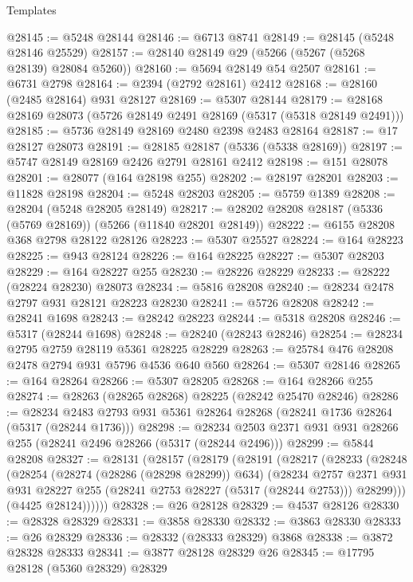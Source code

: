 \begin{lexlean}{Templates}
\begin{coremodule}
@28145 := @5248 @28144
@28146 := @6713 @8741
@28149 := @28145 (@5248 @28146 @25529)
@28157 := @28140 @28149 @29 (@5266 (@5267 (@5268 @28139) @28084 @5260))
@28160 := @5694 @28149 @54 @2507
@28161 := @6731 @2798
@28164 := @2394 (@2792 @28161) @2412
@28168 := @28160 (@2485 @28164) @931 @28127
@28169 := @5307 @28144
@28179 := @28168 @28169 @28073 (@5726 @28149 @2491 @28169 (@5317 (@5318 @28149 @2491)))
@28185 := @5736 @28149 @28169 @2480 @2398 @2483 @28164
@28187 := @17 @28127 @28073
@28191 := @28185 @28187 (@5336 (@5338 @28169))
@28197 := @5747 @28149 @28169 @2426 @2791 @28161 @2412
@28198 := @151 @28078
@28201 := @28077 (@164 @28198 @255)
@28202 := @28197 @28201
@28203 := @11828 @28198
@28204 := @5248 @28203
@28205 := @5759 @1389
@28208 := @28204 (@5248 @28205 @28149)
@28217 := @28202 @28208 @28187 (@5336 (@5769 @28169)) (@5266 (@11840 @28201 @28149))
@28222 := @6155 @28208 @368 @2798 @28122 @28126
@28223 := @5307 @25527
@28224 := @164 @28223
@28225 := @943 @28124
@28226 := @164 @28225
@28227 := @5307 @28203
@28229 := @164 @28227 @255
@28230 := @28226 @28229
@28233 := @28222 (@28224 @28230) @28073
@28234 := @5816 @28208
@28240 := @28234 @2478 @2797 @931 @28121 @28223 @28230
@28241 := @5726 @28208
@28242 := @28241 @1698
@28243 := @28242 @28223
@28244 := @5318 @28208
@28246 := @5317 (@28244 @1698)
@28248 := @28240 (@28243 @28246)
@28254 := @28234 @2795 @2759 @28119 @5361 @28225 @28229
@28263 := @25784 @476 @28208 @2478 @2794 @931 @5796 @4536 @640 @560
@28264 := @5307 @28146
@28265 := @164 @28264
@28266 := @5307 @28205
@28268 := @164 @28266 @255
@28274 := @28263 (@28265 @28268) @28225 (@28242 @25470 @28246)
@28286 := @28234 @2483 @2793 @931 @5361 @28264 @28268 (@28241 @1736 @28264 (@5317 (@28244 @1736)))
@28298 := @28234 @2503 @2371 @931 @931 @28266 @255 (@28241 @2496 @28266 (@5317 (@28244 @2496)))
@28299 := @5844 @28208
@28327 := @28131
    (@28157
      (@28179
        (@28191
          (@28217
            (@28233
              (@28248
                (@28254
                  (@28274 (@28286 (@28298 @28299)) @634)
                  (@28234
                    @2757
                    @2371
                    @931
                    @931
                    @28227
                    @255
                    (@28241 @2753 @28227 (@5317 (@28244 @2753)))
                    @28299)))
              (@4425 @28124))))))
@28328 := @26 @28128
@28329 := @4537 @28126
@28330 := @28328 @28329
@28331 := @3858 @28330
@28332 := @3863 @28330
@28333 := @26 @28329
@28336 := @28332 (@28333 @28329) @3868
@28338 := @3872 @28328 @28333
@28341 := @3877 @28128 @28329 @26
@28345 := @17795 @28128 (@5360 @28329) @28329

\end{coremodule}
\end{lexlean}
